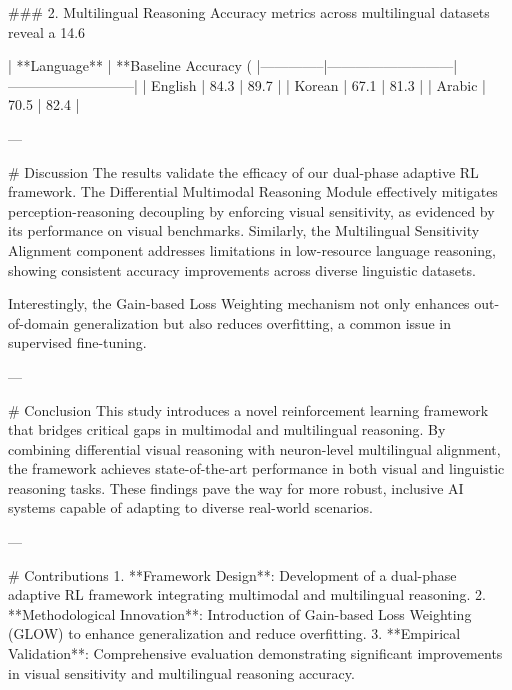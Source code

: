 ### 2. Multilingual Reasoning  
Accuracy metrics across multilingual datasets reveal a 14.6%

| **Language** | **Baseline Accuracy (%
|--------------|---------------------------|---------------------------|  
| English      | 84.3                      | 89.7                      |  
| Korean       | 67.1                      | 81.3                      |  
| Arabic       | 70.5                      | 82.4                      |  

---

# Discussion  
The results validate the efficacy of our dual-phase adaptive RL framework. The Differential Multimodal Reasoning Module effectively mitigates perception-reasoning decoupling by enforcing visual sensitivity, as evidenced by its performance on visual benchmarks. Similarly, the Multilingual Sensitivity Alignment component addresses limitations in low-resource language reasoning, showing consistent accuracy improvements across diverse linguistic datasets.

Interestingly, the Gain-based Loss Weighting mechanism not only enhances out-of-domain generalization but also reduces overfitting, a common issue in supervised fine-tuning.

---

# Conclusion  
This study introduces a novel reinforcement learning framework that bridges critical gaps in multimodal and multilingual reasoning. By combining differential visual reasoning with neuron-level multilingual alignment, the framework achieves state-of-the-art performance in both visual and linguistic reasoning tasks. These findings pave the way for more robust, inclusive AI systems capable of adapting to diverse real-world scenarios.

---

# Contributions  
1. **Framework Design**: Development of a dual-phase adaptive RL framework integrating multimodal and multilingual reasoning.  
2. **Methodological Innovation**: Introduction of Gain-based Loss Weighting (GLOW) to enhance generalization and reduce overfitting.  
3. **Empirical Validation**: Comprehensive evaluation demonstrating significant improvements in visual sensitivity and multilingual reasoning accuracy.  

